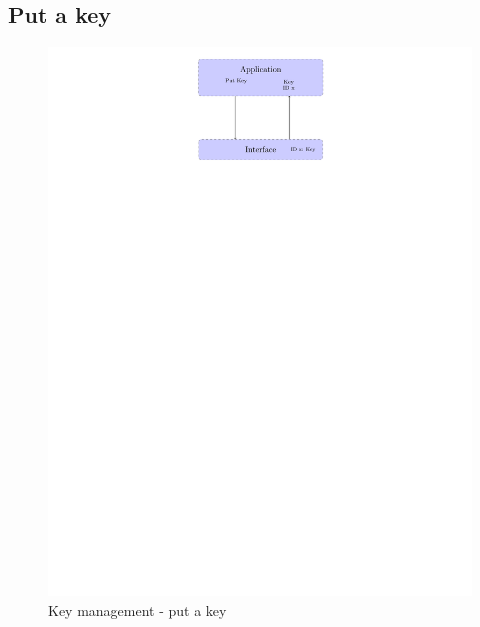 \subsection*{Put a key}
\begin{figure}[!ht]
\centering
\includegraphics[trim=12cm 22cm 9.5cm 0cm]{figures/key_manag_put_key.pdf}
\caption{Key management - put a key\newline}
\label{fig:gci_key_mng_put}
\end{figure}
